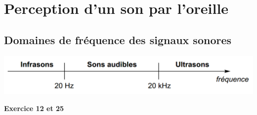 \section{Perception d'un son par l'oreille}
\subsection{Domaines de fréquence des signaux sonores}
\begin{tcolorbox}[colback=red!5!white,colframe=red!75!black,title=\textbf{Fréquences des signaux sonores : }]
\vspace{2cm}
\begin{center}
    \includegraphics[scale=0.7]{Images/domaine_freq.PNG}
\end{center}
\vspace{1cm}%
\end{tcolorbox}
\begin{Large}
\end{Large}\textbf{Exercice 12 et 25}


